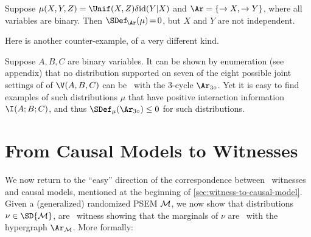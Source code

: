\begin{subappendices}
\begin{example}
    Suppose $\mu(X,Y,Z) = \Unif(X,Z) \delta \mathrm{id} (Y|X)$ and $\Ar = \{\to X, \to Y\}$,
    where all variables are binary.
    Then $\SDef_{\!\Ar}(\mu) \,{=}\, 0$, but $X$ and $Y$ are not independent.
    \qedhere
\end{example}
Here is another counter-example, of a very different kind.
\begin{example}
    Suppose  $A, B, C$ are binary variables.
    It can be shown by enumeration (see appendix) that
    no distribution supported on seven of the eight
    possible joint settings of of $\V(A,B,C)$ can be
    \scible\ with the 3-cycle $\Ar_{3\circ}$. Yet it is easy
    to find examples of such distributions $\mu$ that have positive
    interaction information $\I(A;B;C)$,
    and thus $\SDef_{\mu}(\Ar_{3\circ}) \le 0$ for such distributions.
\end{example}

\section{From Causal Models to Witnesses}
    \label{appendix:sem2witness}
    
We now return to the ``easy'' direction of the correspondence between \scibility\ witnesses and causal models, mentioned at the beginning of \cref{sec:witness-to-causal-model}.
Given a (generalized) randomized PSEM $\cal M$, we now show that distributions $\nu \in \SD{\cal M}$, are \scibility\ witness showing that the marginals of $\nu$ are \scible\ with the hypergraph $\Ar_{\cal M}$. 
More formally:


\end{subappendices}
